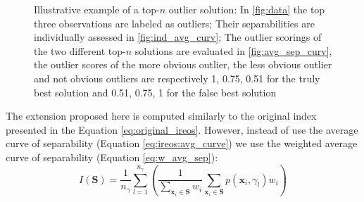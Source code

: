 \begin{figure}[ht!]
\center
{}
\qquad
{}
\qquad
{}
\caption{Illustrative example of a top-$n$ outlier solution: In \ref{fig:data} the top three observations are labeled as outliers; Their separabilities are individually assessed in \ref{fig:ind_avg_curv}; The outlier scorings of the two different top-$n$ solutions are evaluated in \ref{fig:avg_sep_curv}, the outlier scores of the more obvious outlier, the less obvious outlier and not obvious outliers are respectively 1, 0.75, 0.51 for the truly best solution and 0.51, 0.75, 1 for the false best solution}
\label{fig:ilustration}
\end{figure}

The extension proposed here is computed similarly to the original index presented in the Equation \ref{eq:original_ireos}. However, instead of use the average curve of separability (Equation \ref{eq:ireos:avg_curve}) we use the weighted average curve of separability (Equation \ref{eq:w_avg_sep}):
\begin{equation}
I(\mathbf{S}) = \frac{1}{n_{\gamma}} \sum_{l = 1}^{n_{\gamma}} \left( \frac{1}{\sum_{\mathbf{x}_i \in \mathbf{S}} w_i} \sum_{\mathbf{x}_i \in \mathbf{S}} p(\mathbf{x}_i, \gamma_l) w_i \right)
\label{eq:ext_ireos}
\end{equation}

